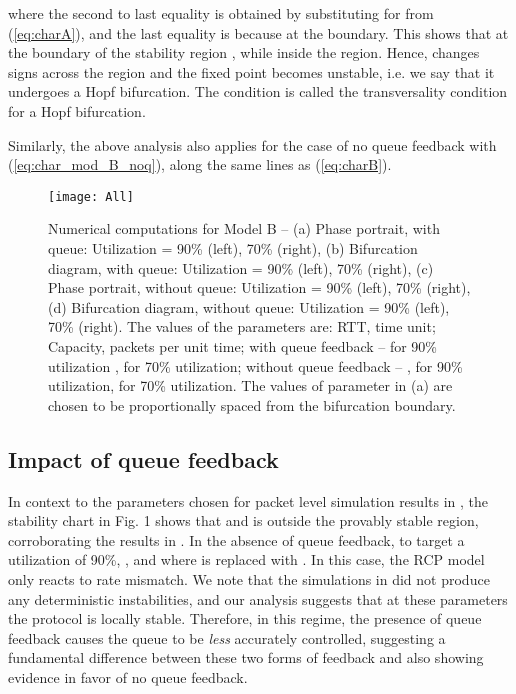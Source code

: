 \documentclass[conference]{IEEEtran}
\begin{document}
where the second to last equality is obtained by substituting for  from 
(\ref{eq:charA}), and the last equality is because  at the boundary. This shows that at the boundary of the 
stability region , while  inside the region. Hence,  changes signs across the region and the fixed point becomes unstable, i.e. we say that it undergoes a Hopf bifurcation.
The condition  is
called the transversality condition for a Hopf bifurcation.

Similarly, the above analysis also applies for the case of no queue feedback with (\ref{eq:char_mod_B_noq}), along the same lines as (\ref{eq:charB}).

\begin{figure*}
\centering
{}





\texttt{[image: All]}
\caption{Numerical computations for Model B -- (a) Phase portrait, with queue: Utilization = 90\% (left), 
70\% (right), (b) Bifurcation diagram, with queue: Utilization = 90\% (left), 70\% (right), 
(c) Phase portrait, without queue: Utilization = 90\% (left), 70\% (right), (d) Bifurcation diagram, 
without queue: Utilization = 90\% (left), 70\% (right). The values of the parameters are: RTT,  time unit; 
Capacity,  packets per unit time; with queue feedback --  for 90\% utilization ,  for 
70\% utilization; without queue feedback -- ,  for 90\% utilization,  for
 70\% utilization. The values of parameter  in (a) are chosen to be proportionally spaced from the bifurcation boundary.}
\label{4x2_plot}
\end{figure*}

\subsection{Impact of queue feedback}

In context to the parameters chosen for packet level simulation results in \cite[Fig.~5]{krv}, the stability chart in Fig. 1 shows that  and  is outside the provably 
stable region, corroborating the results in \cite[Fig.~5]{krv}. In the absence of queue feedback, to target a utilization of 90\%, , 
 and  where  is replaced with . In this case, the RCP model only 
reacts to rate mismatch. We note that the simulations in \cite{krv} did not produce any deterministic instabilities, and our analysis suggests that at these parameters the protocol is locally stable. Therefore, in this regime, the presence of queue feedback causes the queue 
to be \textit{less} accurately controlled, suggesting a fundamental
difference between these two forms of feedback and also showing evidence in favor of no queue feedback.
\end{document}
